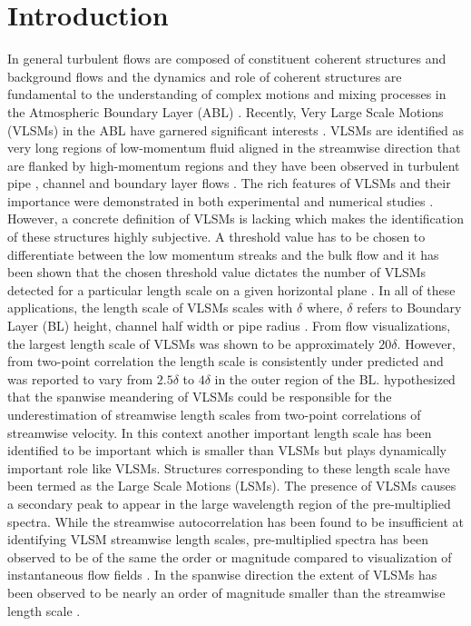 \documentclass{amsart}
\begin{document}
\section{Introduction}
\label{intro} 
In general turbulent flows  are composed of constituent coherent structures and background flows \citep{hussain_1986_jfm} and the dynamics and role of coherent structures are fundamental to the understanding of complex motions and mixing processes in the Atmospheric Boundary Layer (ABL) \citep{lewalle_flowTurbCom_00,Fiedler_PAeroSci_1988}. Recently, Very Large Scale Motions (VLSMs) in the ABL have garnered significant interests \citep[eg.][]{Chinthaka_blm_2017,kerherv_roux_etfs_2017}. VLSMs  are identified as  very long regions of low-momentum fluid aligned in the streamwise direction that are flanked by high-momentum regions and they have been observed in turbulent pipe \citep{guala_adrian_jfm2006, kim_adrian_pof99, monty_jfm_07}, channel \citep{guala_adrian_jfm2006, monty_jfm_07, lee_sung_jfm_14} and boundary layer flows \citep{fang2015blm,hutchins_marusic_jfm2007}. The rich features of VLSMs and their importance were demonstrated in both experimental \citep{kim_adrian_pof99,guala_adrian_jfm2006,hutchins_marusic_jfm2007,monty_jfm_07} and numerical studies \citep{fang2015blm,lee_sung_jfm_14,Lee_sung_jfm11}. However, a concrete definition of VLSMs is lacking which makes the identification of these structures highly subjective. A threshold value has to be chosen to differentiate between the low momentum streaks and the bulk flow and it has been shown that the chosen threshold value dictates the number of VLSMs detected for a particular length scale on a given horizontal plane \citep{baltzer_jfm_13}. In all of these applications, the length scale of VLSMs scales with $\delta$ where, $\delta$ refers to Boundary Layer (BL)  height, channel half width or pipe radius \citep{chung_jfm_10_large,monty_jfm_07}. From flow visualizations, the largest length scale of VLSMs was shown to be approximately $20\delta$. However, from two-point correlation the length scale is consistently under predicted and was reported to vary from $2.5\delta$ to $4\delta$ in the outer region of the BL. \citet{hutchins_marusic_jfm2007} hypothesized that the spanwise meandering of VLSMs could be responsible for the underestimation of streamwise length scales from two-point correlations of streamwise velocity. In this context another important length scale has been identified to be important which is smaller than VLSMs but plays dynamically important role like VLSMs. Structures corresponding to these length scale have been termed as the Large Scale Motions (LSMs). The presence of VLSMs causes a secondary peak to appear in the large wavelength region of the pre-multiplied spectra. While the streamwise autocorrelation has been found to be insufficient at identifying VLSM streamwise length scales, pre-multiplied spectra has been observed to be of the same the order or magnitude compared to  visualization of instantaneous flow fields \citep{guala_adrian_jfm2006}. In the spanwise direction the extent of VLSMs has been observed to be nearly an order of magnitude  smaller than the  streamwise length scale \citep{monty_jfm_07}. 
\end{document}
